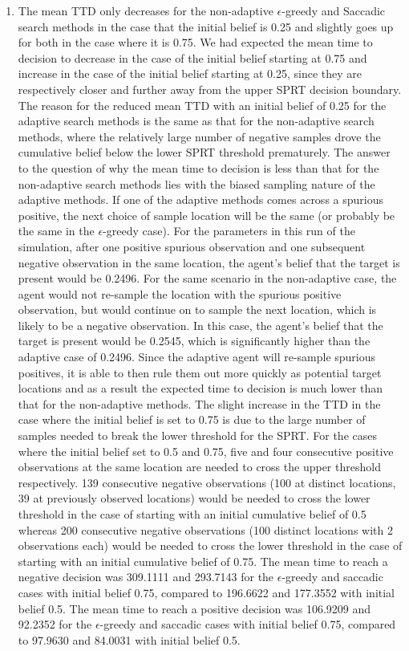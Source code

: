 \begin{enumerate}
    \item The mean TTD only decreases for the non-adaptive $\epsilon$-greedy and Saccadic search methods in the case that the initial belief is 0.25 and slightly goes up for both in the case where it is 0.75. We had expected the mean time to decision to decrease in the case of the initial belief starting at 0.75 and increase in the case of the initial belief starting at 0.25, since they are respectively closer and further away from the upper SPRT decision boundary.
    The reason for the reduced mean TTD with an initial belief of 0.25 for the adaptive search methods is the same as that for the non-adaptive search methods, where the relatively large number of negative samples drove the cumulative belief below the lower SPRT threshold prematurely. The answer to the question of why the mean time to decision is less than that for the non-adaptive search methods lies with the biased sampling nature of the adaptive methods. If one of the adaptive methods comes across a spurious positive, the next choice of sample location will be the same (or probably be the same in the $\epsilon$-greedy case). For the parameters in this run of the simulation, after one positive spurious observation and one subsequent negative observation in the same location, the agent's belief that the target is present would be 0.2496. For the same scenario in the non-adaptive case, the agent would not re-sample the location with the spurious positive observation, but would continue on to sample the next location, which is likely to be a negative observation. In this case, the agent's belief that the target is present would be 0.2545, which is significantly higher than the adaptive case of 0.2496. Since the adaptive agent will re-sample spurious positives, it is able to then rule them out more quickly as potential target locations and as a result the expected time to decision is much lower than that for the non-adaptive methods. The slight increase in the TTD in the case where the initial belief is set to 0.75 is due to the large number of samples needed to break the lower threshold for the SPRT. For the cases where the initial belief set to 0.5 and 0.75, five and four consecutive positive observations at the same location are needed to cross the upper threshold respectively. 139 consecutive negative observations (100 at distinct locations, 39 at previously observed locations) would be needed to cross the lower threshold in the case of starting with an initial cumulative belief of 0.5 whereas 200 consecutive negative observations (100 distinct locations with 2 observations each) would be needed to cross the lower threshold in the case of starting with an initial cumulative belief of 0.75. The mean time to reach a negative decision was 309.1111 and 293.7143 for the $\epsilon$-greedy and saccadic cases with initial belief 0.75, compared to 196.6622 and 177.3552 with initial belief 0.5. The mean time to reach a positive decision was 106.9209 and 92.2352 for the $\epsilon$-greedy and saccadic cases with initial belief 0.75, compared to 97.9630 and 84.0031 with initial belief 0.5. 

\end{enumerate}
